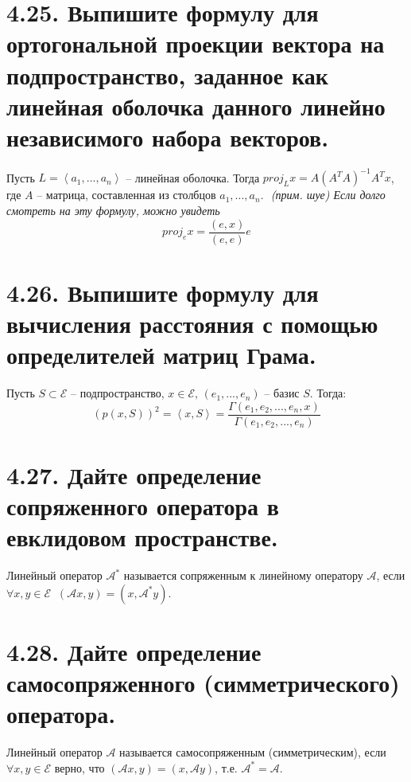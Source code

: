 \documentclass{article}
\begin{document}
\section*{\LARGE 4.25. Выпишите формулу для ортогональной проекции вектора на подпространство, заданное как линейная оболочка данного линейно независимого набора векторов. }
Пусть $L = \left< a_1, ... , a_n \right>$ -- линейная оболочка. Тогда $proj_L x = A(A^T A)^{-1}A^T x$, где $A$ -- матрица, составленная из столбцов $a_1, ... , a_n$.
\newline $ $
\newline \textit{(прим. шуе) Если долго смотреть на эту формулу, можно увидеть}
$$
proj_e x = \frac{(e, x)}{(e, e)}e
$$

\section*{\LARGE 4.26. Выпишите формулу для вычисления расстояния с помощью определителей матриц Грама.}
Пусть $S \subset \mathcal{E}$ -- подпространство, $x \in \mathcal{E},\, (e_1, ... , e_n)$ -- базис $S$. Тогда:
$$
(p(x, S))^2 = \left<x,S\right> = \frac{\Gamma(e_1, e_2, ... , e_n, x)}{\Gamma(e_1, e_2, ... , e_n)}
$$

\section*{\LARGE 4.27. Дайте определение сопряженного оператора в евклидовом пространстве.}
Линейный оператор $\mathcal{A}^*$ называется сопряженным к линейному оператору $\mathcal{A}$, если $\forall x, y \in \mathcal{E} \;\; (\mathcal{A} x, y) = (x, \mathcal{A}^* y)$.

\section*{\LARGE 4.28. Дайте определение самосопряженного (симметрического) оператора.}
Линейный оператор $\mathcal{A}$ называется самосопряженным (симметрическим), если $\forall x, y \in \mathcal{E}$ верно, что $(\mathcal{A}x, y) = (x, \mathcal{A}y)$, т.е. $\mathcal{A}^* = \mathcal{A}$.
\end{document}
